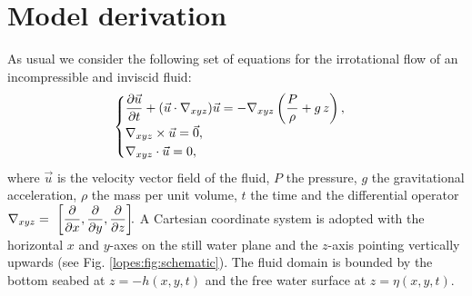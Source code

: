 
\section{Model derivation}
As usual  we consider the following set of
equations for the irrotational flow of an incompressible and inviscid fluid:
\begin{equation}\label{lopes:eq:euler}
\begin{cases}
\displaystyle\frac{\partial  \vec{u}}{\partial 
  t}+(\vec{u}\cdot\nabla_{xyz})\vec{u}=-\nabla_{xyz}\left(\frac{P}{\rho} +g\, z\right),\\
\nabla_{xyz}\times \vec{u}={\vec{0}},  \\
\nabla_{xyz}\cdot{\vec{u}}=0,
\end{cases}
\end{equation}
where \(\vec{u}\) is the  velocity vector field of the fluid, \(P\) the
pressure, \(g\) the gravitational acceleration, \(\rho\) the
mass per unit volume, \(t\) the time and the differential operator \(\displaystyle\nabla_{xyz}=~\left[\frac{\partial }{\partial x},\frac{\partial }{\partial y},\frac{\partial }{\partial z}\right]\!\!.\)
A Cartesian coordinate system is adopted with the
horizontal  \(x\) and \(y\)-axes on the still water plane and
the \(z\)-axis pointing vertically upwards
(see Fig. \ref{lopes:fig:schematic}). The fluid domain is
bounded by the  bottom seabed at \(z=-h(x,y,t)\) and the free
water surface at \(z=\eta(x,y,t)\).

